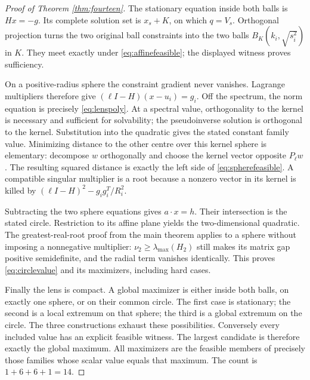 \begin{proof}[Proof of Theorem \ref{thm:fourteen}]
The stationary equation inside both balls is $Hx=-g$. Its complete
solution set is $x_s+K$, on which $q=V_s$. Orthogonal projection turns
the two original ball constraints into the two balls
$B_K(k_i,\sqrt{s_i^2})$ in $K$. They meet exactly under
\eqref{eq:affinefeasible}; the displayed witness proves sufficiency.

On a positive-radius sphere the constraint gradient never vanishes.
Lagrange multipliers therefore give
$(\ell I-H)(x-u_i)=g_i$. Off the spectrum, the norm equation is precisely
\eqref{eq:lenspoly}. At a spectral value, orthogonality to the kernel is
necessary and sufficient for solvability; the pseudoinverse solution is
orthogonal to the kernel. Substitution into the quadratic gives the stated
constant family value. Minimizing distance to the other centre over this
kernel sphere is elementary: decompose $w$ orthogonally and choose the
kernel vector opposite $P_\ell w$. The resulting squared distance is
exactly the left side of \eqref{eq:spherefeasible}. A compatible singular
multiplier is a root because a nonzero vector in its kernel is killed by
$(\ell I-H)^2-g_ig_i^T/R_i^2$.

Subtracting the two sphere equations gives $a\cdot x=h$. Their
intersection is the stated circle. Restriction to its affine plane yields
the two-dimensional quadratic. The greatest-real-root proof from the
main theorem applies to a sphere without imposing a nonnegative
multiplier: $\nu_2\geq\lambda_{\max}(H_2)$ still makes its matrix gap
positive semidefinite, and the radial term vanishes identically.
This proves \eqref{eq:circlevalue} and its maximizers, including hard cases.

Finally the lens is compact. A global maximizer is either inside both
balls, on exactly one sphere, or on their common circle. The first case
is stationary; the second is a local extremum on that sphere; the third
is a global extremum on the circle. The three constructions exhaust
these possibilities. Conversely every included value has an explicit
feasible witness. The largest candidate is therefore exactly the global
maximum. All maximizers are the feasible members of precisely those
families whose scalar value equals that maximum. The count is
$1+6+6+1=14$.
\end{proof}

